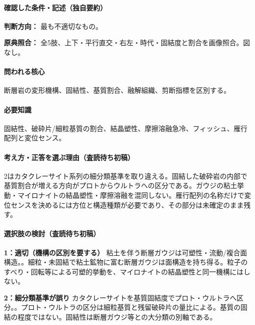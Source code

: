\paragraph{確認した条件・記述（独自要約）}\mbox{}\par

\noindent\textbf{判断方向：} 最も不適切なもの。\par

\noindent\textbf{原典照合：} 全5肢、上下・平行直交・右左・時代・固結度と割合を画像照合。図なし。\par

\paragraph{問われる核心} 断層岩の変形機構、固結性、基質割合、融解組織、剪断指標を区別する。

\paragraph{必要知識} 固結性、破砕片/細粒基質の割合、結晶塑性、摩擦溶融急冷、フィッシュ、雁行配列と変位センス。

\paragraph{考え方・正答を選ぶ理由（査読待ち初稿）} 2はカタクレーサイト系列の細分類基準を取り違える。固結した破砕岩の内部で基質割合が増える方向がプロトからウルトラへの区分である。ガウジの粘土挙動・マイロナイトの結晶塑性・摩擦溶融を混同しない。雁行配列の名称だけで変位センスを決めるには方位と構造種類が必要であり、その部分は未確定のまま残す。

\paragraph{選択肢の検討（査読待ち初稿）}\mbox{}\par

\noindent\textbf{1：適切（機構の区別を要する）} 粘土を伴う断層ガウジは可塑性・流動/複合面構造。。細粒・未固結で粘土鉱物に富む断層ガウジは面構造を持ち得る。粒子のすべり・回転等による可塑的挙動を、マイロナイトの結晶塑性と同一機構にはしない。\par

\noindent\textbf{2：細分類基準が誤り} カタクレーサイトを基質固結度でプロト・ウルトラへ区分。。プロト・ウルトラの区分は細粒基質と残留破砕片の量比による。基質の固結の程度ではない。固結性は断層ガウジ等との大分類の別軸である。\par

